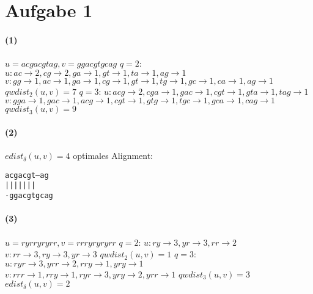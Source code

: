 \documentclass[a4paper,10pt]{article}
\begin{document}
\section*{Aufgabe 1}
\paragraph{(1)}
$u=acgacgtag, v=ggacgtgcag$\newline
$q=2$:\newline
$u: ac\to 2, cg\to 2, ga\to 1, gt\to 1, ta\to 1, ag\to 1$\newline
$v: gg\to 1, ac\to 1, ga\to 1, cg\to 1, gt\to 1, tg\to 1, gc\to 1, ca\to 1,
ag\to 1$\newline
$qwdist_2(u,v)=7$\newline\newline
$q=3$:\newline
$u: acg\to 2, cga\to 1, gac\to 1, cgt\to 1, gta\to 1, tag\to 1$\newline
$v: gga\to 1, gac\to 1, acg\to 1, cgt\to 1, gtg\to 1, tgc\to 1, gca\to 1, cag\to
1$\newline
$qwdist_3(u,v)=9$\newline
\paragraph{(2)}
$edist_\delta(u,v)=4$\newline
optimales Alignment:
\begin{alltt}
acgacgt--ag
  |||||  ||
-ggacgtgcag
\end{alltt}
\paragraph{(3)}
$u=ryrryryrr, v=rrryryryrr$\newline
$q=2$:\newline
$u: ry\to 3, yr\to 3, rr\to 2$\newline
$v: rr\to 3, ry\to 3, yr\to 3$\newline
$qwdist_2(u,v)=1$\newline\newline
$q=3$:\newline
$u: ryr\to 3, yrr\to 2, rry\to 1, yry\to 1$\newline
$v: rrr\to 1, rry\to 1, ryr\to 3, yry\to 2, yrr\to 1$\newline
$qwdist_3(u,v)=3$\newline\newline
$edist_\delta(u,v)=2$\newline
\end{document}
